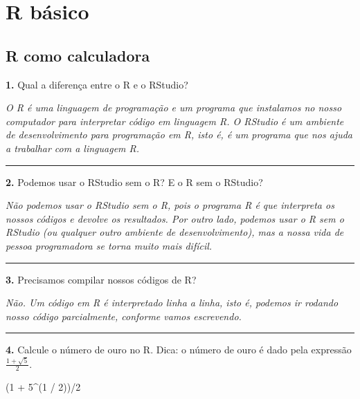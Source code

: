 \documentclass[
]{book}
\newenvironment{Shaded}{\begin{snugshade}}{\end{snugshade}}
\newcommand{\DecValTok}[1]{\textcolor[rgb]{0.00,0.00,0.81}{#1}}
\newcommand{\NormalTok}[1]{#1}
\newcommand{\SpecialCharTok}[1]{\textcolor[rgb]{0.00,0.00,0.00}{#1}}
\begin{document}
\hypertarget{r-buxe1sico}{%
\section{R básico}\label{r-buxe1sico}}

\hypertarget{r-como-calculadora-1}{%
\subsection*{R como calculadora}\label{r-como-calculadora-1}}

\textbf{1.} Qual a diferença entre o R e o RStudio?

\emph{O R é uma linguagem de programação e um programa que instalamos no nosso computador para interpretar código em linguagem R. O RStudio é um ambiente de desenvolvimento para programação em R, isto é, é um programa que nos ajuda a trabalhar com a linguagem R.}

\begin{center}\rule{0.5\linewidth}{0.5pt}\end{center}

\textbf{2.} Podemos usar o RStudio sem o R? E o R sem o RStudio?

\emph{Não podemos usar o RStudio sem o R, pois o programa R é que interpreta os nossos códigos e devolve os resultados. Por outro lado, podemos usar o R sem o RStudio (ou qualquer outro ambiente de desenvolvimento), mas a nossa vida de pessoa programadora se torna muito mais difícil.}

\begin{center}\rule{0.5\linewidth}{0.5pt}\end{center}

\textbf{3.} Precisamos compilar nossos códigos de R?

\emph{Não. Um código em R é interpretado linha a linha, isto é, podemos ir rodando nosso código parcialmente, conforme vamos escrevendo.}

\begin{center}\rule{0.5\linewidth}{0.5pt}\end{center}

\textbf{4.} Calcule o número de ouro no R. Dica: o número de ouro é dado pela expressão \(\frac{1 + \sqrt{5}}{2}\).

\begin{Shaded}
\begin{Highlighting}[]
\NormalTok{(}\DecValTok{1} \SpecialCharTok{+} \DecValTok{5}\SpecialCharTok{\^{}}\NormalTok{(}\DecValTok{1} \SpecialCharTok{/} \DecValTok{2}\NormalTok{))}\SpecialCharTok{/}\DecValTok{2}
\end{Highlighting}
\end{Shaded}
\end{document}
